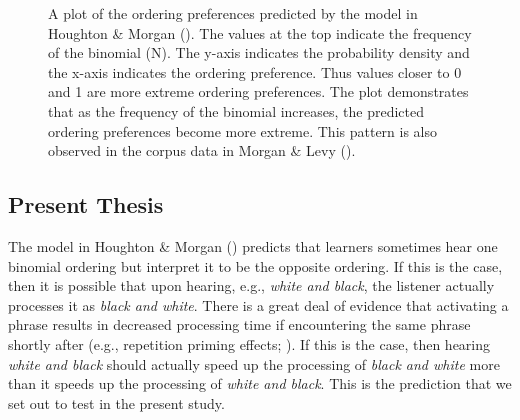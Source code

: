 \documentclass[
  12pt,
]{scrartcl}
\begin{document}
\begin{figure}[htbp]

\caption{\label{fig-corpusourmodel}A plot of the ordering preferences
predicted by the model in Houghton \& Morgan
().
The values at the top indicate the frequency of the binomial (N). The
y-axis indicates the probability density and the x-axis indicates the
ordering preference. Thus values closer to 0 and 1 are more extreme
ordering preferences. The plot demonstrates that as the frequency of the
binomial increases, the predicted ordering preferences become more
extreme. This pattern is also observed in the corpus data in Morgan \&
Levy ().}


\end{figure}%

\subsection{Present Thesis}\label{present-thesis}

The model in Houghton \& Morgan
()
predicts that learners sometimes hear one binomial ordering but
interpret it to be the opposite ordering. If this is the case, then it
is possible that upon hearing, e.g., \emph{white and black}, the
listener actually processes it as \emph{black and white}. There is a
great deal of evidence that activating a phrase results in decreased
processing time if encountering the same phrase shortly after (e.g.,
repetition priming effects;
). If this is the case, then hearing \emph{white and
black} should actually speed up the processing of \emph{black and white}
more than it speeds up the processing of \emph{white and black}. This is
the prediction that we set out to test in the present study.
\end{document}
